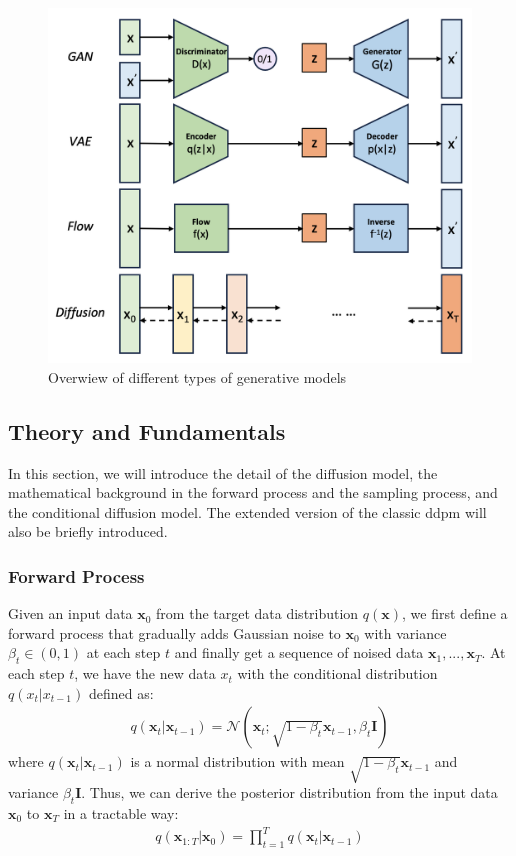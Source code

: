 \documentclass[12pt,DIV14,BCOR12mm,a4paper,footinclude=false,headinclude,parskip=half-,twoside,openright,cleardoublepage=empty,toc=index,bibliography=totoc,listof=totoc]{scrreprt}
\numberwithin{equation}{chapter}
\begin{document}
\begin{figure}[h]
	\centering
	\includegraphics[scale=.3]{img/gen.png}
	\caption{Overwiew of different types of generative models}
	\label{img:gen}
\end{figure}

\subsection{Theory and Fundamentals}\label{sec:theory}
In this section, we will introduce the detail of the diffusion model, the mathematical background in the forward process and the sampling process, and the conditional diffusion model. The extended version of the classic \gls{ddpm} will also be briefly introduced.

\subsubsection{Forward Process}
Given an input data $\mathbf{x}_{0}$ from the target data distribution $q(\mathbf{x})$, we first define a forward process that gradually adds Gaussian noise to $\mathbf{x}_{0}$ with variance $\beta_{t}\in (0, 1)$ at each step $t$ and finally get a sequence of noised data $\mathbf{x}_{1},...,\mathbf{x}_{T}$. At each step $t$, we have the new data $x_{t}$ with the conditional distribution $q(x_{t}|x_{t-1})$ defined as:
\begin{align}
  q(\mathbf{x}_{t}|\mathbf{x}_{t-1}) = \mathcal{N}(\mathbf{x}_{t}; \sqrt{1-\beta_{t}}\mathbf{x}_{t-1}, \beta_{t}\mathbf{I})
\end{align}
where $q(\mathbf{x}_{t}|\mathbf{x}_{t-1})$ is a normal distribution with mean $\sqrt{1-\beta_{t}}\mathbf{x}_{t-1}$ and variance $\beta_{t}\mathbf{I}$. Thus, we can derive the posterior distribution from the input data $\mathbf{x}_{0}$ to $\mathbf{x}_{T}$ in a tractable way:
\begin{align}
  q(\mathbf{x}_{1:T}|\mathbf{x}_{0}) = \prod_{t=1}^{T}q(\mathbf{x}_{t}|\mathbf{x}_{t-1})
\end{align}
\end{document}
